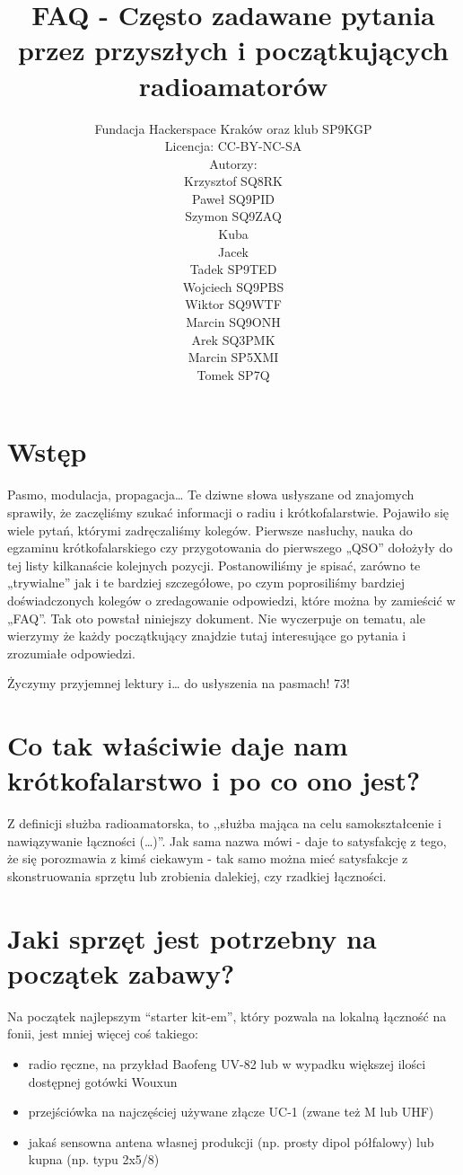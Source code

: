 \documentclass[a4paper,12pt]{article}
\title{\textbf{FAQ - Często zadawane pytania przez przyszłych i początkujących radioamatorów}}
\author{Fundacja Hackerspace Kraków
oraz klub SP9KGP\\
Licencja: CC-BY-NC-SA\\
\vspace{1ex}
Autorzy:\\
Krzysztof SQ8RK\\
Paweł SQ9PID\\
Szymon SQ9ZAQ\\
Kuba\\
Jacek\\
Tadek SP9TED\\
Wojciech SQ9PBS\\
Wiktor SQ9WTF\\
Marcin SQ9ONH\\
Arek SQ3PMK\\
Marcin SP5XMI\\
Tomek SP7Q}
\begin{document}
\maketitle

\newpage
\newpage

\section{Wstęp}
Pasmo, modulacja, propagacja… Te dziwne słowa usłyszane od znajomych sprawiły, że zaczęliśmy szukać informacji o radiu i krótkofalarstwie. Pojawiło się wiele pytań, którymi zadręczaliśmy kolegów. Pierwsze nasłuchy, nauka do egzaminu krótkofalarskiego czy przygotowania do pierwszego „QSO” dołożyły do tej listy kilkanaście kolejnych pozycji. Postanowiliśmy je spisać, zarówno te „trywialne” jak i te bardziej szczegółowe, po czym poprosiliśmy bardziej doświadczonych kolegów o zredagowanie odpowiedzi, które można by zamieścić w „FAQ”. Tak oto powstał niniejszy dokument. Nie wyczerpuje on tematu, ale wierzymy że każdy początkujący znajdzie tutaj interesujące go pytania i zrozumiałe odpowiedzi. 

Życzymy przyjemnej lektury i… do usłyszenia na pasmach! 73!

\section{Co tak właściwie daje nam krótkofalarstwo i po co ono jest?}
Z definicji służba radioamatorska, to ,,służba mająca na celu samokształcenie i nawiązywanie łączności (…)''. Jak sama nazwa mówi - daje to satysfakcję z tego, że się porozmawia z kimś ciekawym - tak samo można mieć satysfakcje z skonstruowania sprzętu lub zrobienia dalekiej, czy rzadkiej łączności.

\section{Jaki sprzęt jest potrzebny na początek zabawy?}
Na początek najlepszym “starter kit-em”, który pozwala na lokalną łączność na fonii, jest mniej więcej coś takiego:
\begin{itemize}
 \item radio ręczne, na przykład Baofeng UV-82 lub w wypadku większej ilości dostępnej gotówki Wouxun
 \item przejściówka na najczęściej używane złącze UC-1 (zwane też M lub UHF)
 \item jakaś sensowna antena własnej produkcji (np. prosty dipol półfalowy) lub kupna (np. typu 2x5/8)
\end{itemize}
\end{document}
